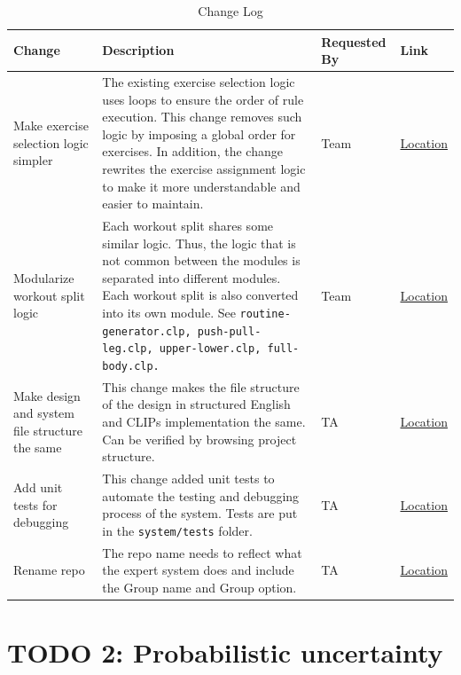 \documentclass{article}
\begin{document}
\begin{table}[h]
\centering
\begin{tabular}{|p{2cm}|p{8cm}|p{3cm}|l|}
\hline
\textbf{Change} & \textbf{Description} & \textbf{Requested By} & \textbf{Link} \\
\hline
Make exercise selection logic simpler & The existing exercise selection logic uses loops to ensure the order of rule execution. This change removes such logic by imposing a global order for exercises. In addition, the change rewrites the exercise assignment logic to make it more understandable and easier to maintain. & Team & \href{https://github.com/joshpham97/COMP474Project_OptionB_PhamTran_ExerciseRecommender/blob/main/system/rules/routine-generator.clp#L72-L175}{Location} \\
\hline
Modularize workout split logic & Each workout split shares some similar logic. Thus, the logic that is not common between the modules is separated into different modules. Each workout split is also converted into its own module. See \texttt{routine-generator.clp, push-pull-leg.clp, upper-lower.clp, full-body.clp.} & Team & \href{https://github.com/joshpham97/COMP474Project_OptionB_PhamTran_ExerciseRecommender/blob/main/system/rules}{Location} \\
\hline
Make design and system file structure the same & This change makes the file structure of the design in structured English and CLIPs implementation the same. Can be verified by browsing project structure. & TA & \href{https://github.com/joshpham97/COMP474Project_OptionB_PhamTran_ExerciseRecommender}{Location}  \\
\hline
Add unit tests for debugging & This change added unit tests to automate the testing and debugging process of the system. Tests are put in the \texttt{system/tests} folder. & TA & \href{https://github.com/joshpham97/COMP474Project_OptionB_PhamTran_ExerciseRecommender/tree/main/system/tests}{Location}\\
\hline
Rename repo & The repo name needs to reflect what the expert system does and include the Group name and Group option. & TA & \href{https://github.com/joshpham97/COMP474Project_OptionB_PhamTran_ExerciseRecommender}{Location} \\
\hline
\end{tabular}
\caption{Change Log}
\label{tab:changelog}
\end{table}


\section{TODO 2: Probabilistic uncertainty}
\end{document}
